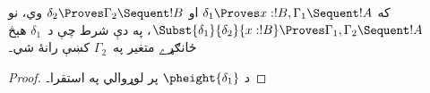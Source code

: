 \documentclass[../../../include/open-logic-section]{subfiles}
\begin{document}
\begin{prop}
که $\delta_1 \Proves x:!B, \Gamma_1 \Sequent
!A$ او $\delta_2 \Proves \Gamma_2 \Sequent !B$ وي، نو
$\Subst{\delta_1}{\delta_2}{x:!B} \Proves \Gamma_1, \Gamma_2 \Sequent
!A$، په دې شرط چې د~$\delta_1$ هېڅ ځانګړے متغير په~$\Gamma_2$
کښې رانۀ شي۔
\end{prop}

\begin{proof}
د $\pheight{\delta_1}$ پر لوړوالي په استقرا۔
\end{proof}
\end{document}
